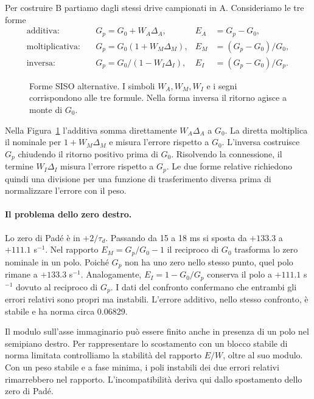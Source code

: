 Per costruire B partiamo dagli stessi drive campionati in A. Consideriamo le tre forme
\begin{align*}
\text{additiva:}\quad&G_p=G_0+W_A\Delta_A, &E_A&=G_p-G_0,\\
\text{moltiplicativa:}\quad&G_p=G_0(1+W_M\Delta_M), &E_M&=(G_p-G_0)/G_0,\\
\text{inversa:}\quad&G_p=G_0/(1-W_I\Delta_I), &E_I&=(G_p-G_0)/G_p.
\end{align*}

\begin{figure}[!htbp]\centering
\resizebox{.80\linewidth}{!}{}
\caption{Forme SISO alternative. I simboli $W_A,W_M,W_I$ e i segni
corrispondono alle tre formule. Nella forma inversa il ritorno agisce a monte di $G_0$.}\label{fig:forme-drive}
\end{figure}

Nella Figura~\ref{fig:forme-drive} l'additiva somma direttamente
$W_A\Delta_A$ a $G_0$. La diretta moltiplica il nominale per
$1+W_M\Delta_M$ e misura l'errore rispetto a $G_0$. L'inversa
costruisce $G_p$ chiudendo il ritorno positivo prima di $G_0$.
Risolvendo la connessione, il termine $W_I\Delta_I$ misura l'errore
rispetto a $G_p$. Le due forme relative richiedono quindi una
divisione per una funzione di trasferimento diversa prima di
normalizzare l'errore con il peso.

\paragraph*{Il problema dello zero destro.}
Lo zero di Padé è in $+2/\tau_d$. Passando da 15 a 18 ms si sposta
da $+133.3$ a $+111.1$ s$^{-1}$. Nel rapporto
$E_M=G_p/G_0-1$ il reciproco di $G_0$ trasforma lo zero nominale
in un polo. Poiché $G_p$ non ha uno zero nello stesso punto, quel
polo rimane a $+133.3$ s$^{-1}$. Analogamente,
$E_I=1-G_0/G_p$ conserva il polo a $+111.1$ s$^{-1}$ dovuto
al reciproco di $G_p$. I dati del confronto confermano che entrambi
gli errori relativi sono propri ma instabili. L'errore additivo,
nello stesso confronto, è stabile e ha norma circa 0.06829.

Il modulo sull'asse immaginario può essere finito anche in presenza
di un polo nel semipiano destro. Per rappresentare lo scostamento con
un blocco stabile di norma limitata controlliamo la stabilità del
rapporto $E/W$, oltre al suo modulo. Con un peso stabile e a fase
minima, i poli instabili dei due errori relativi rimarrebbero nel
rapporto. L'incompatibilità deriva qui dallo spostamento dello zero
di Padé.

